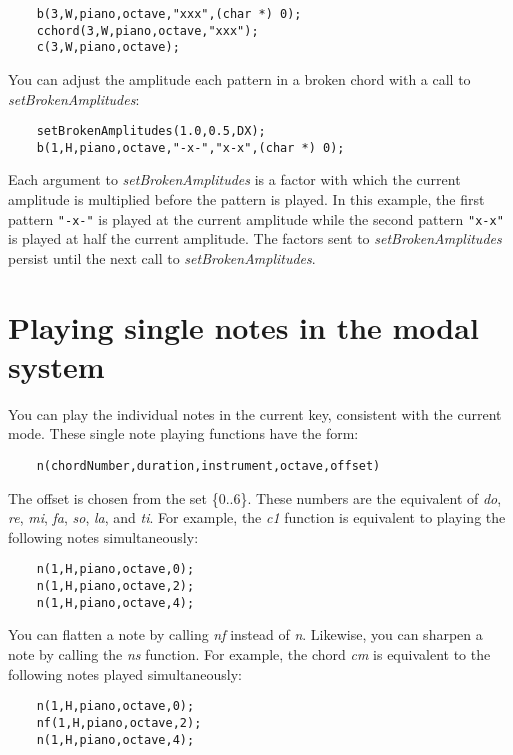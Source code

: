 \documentclass{article}
\begin{document}
\begin{verbatim}
    b(3,W,piano,octave,"xxx",(char *) 0);
    cchord(3,W,piano,octave,"xxx");
    c(3,W,piano,octave);
\end{verbatim}

You can adjust the amplitude each pattern in a broken chord with a call
to {\it setBrokenAmplitudes}:

\begin{verbatim}
    setBrokenAmplitudes(1.0,0.5,DX);
    b(1,H,piano,octave,"-x-","x-x",(char *) 0);
\end{verbatim}

Each argument to {\it setBrokenAmplitudes} is a factor with which the current
amplitude is multiplied before the pattern is played. In this example,
the first pattern \verb!"-x-"! is played at the current amplitude while the
second pattern \verb!"x-x"! is played at half the current amplitude.
The factors sent to {\it setBrokenAmplitudes} persist until the next call to
{\it setBrokenAmplitudes}.

\section*{Playing single notes in the modal system}

You can play the individual notes in the current key, consistent with
the current mode. These single note playing functions have the form:

\begin{verbatim}
    n(chordNumber,duration,instrument,octave,offset)
\end{verbatim}

The offset is chosen from the set \{0..6\}. These numbers
are the equivalent of {\it do}, {\it re}, {\it mi}, {\it fa}, {\it so},
{\it la}, and {\it ti}. For example, the {\it c1} function is equivalent
to playing the following notes simultaneously:

\begin{verbatim}
    n(1,H,piano,octave,0);
    n(1,H,piano,octave,2);
    n(1,H,piano,octave,4);
\end{verbatim}

You can flatten a note by calling {\it nf} instead of {\it n}.
Likewise, you can sharpen a note by calling the {\it ns} function.
For example,
the chord {\it cm} is equivalent to the following notes played simultaneously:

\begin{verbatim}
    n(1,H,piano,octave,0);
    nf(1,H,piano,octave,2);
    n(1,H,piano,octave,4);
\end{verbatim}
\end{document}
